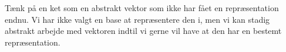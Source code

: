 Tænk på en ket som en abstrakt vektor som ikke har fået en repræsentation endnu. Vi har ikke valgt en base at repræsentere den i, men vi kan stadig abstrakt arbejde med vektoren indtil vi gerne vil have at den har en bestemt repræsentation.